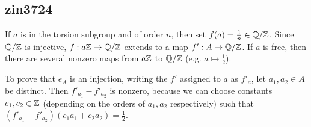 \subsection{zin3724} \label{ex2.3.2}
If $a$ is in the torsion subgroup and of order $n$, then set $f(a)=\frac{1}{n}\in\mathbb{Q}/\mathbb{Z}$. Since $\mathbb{Q}/\mathbb{Z}$ is injective, $f:a\mathbb{Z}\rightarrow\mathbb{Q}/\mathbb{Z}$ extends to a map $f':A\rightarrow\mathbb{Q}/\mathbb{Z}$. If $a$ is free, then there are several nonzero maps from $a\mathbb{Z}$ to $\mathbb{Q}/\mathbb{Z}$ (e.g. $a\mapsto\frac{1}{2}$).

To prove that $e_A$ is an injection, writing the $f'$ assigned to $a$ as $f'_a$, let $a_1,a_2\in A$ be distinct. Then $f'_{a_1}-f'_{a_2}$ is nonzero, because we can choose constants $c_1,c_2\in\mathbb{Z}$ (depending on the orders of $a_1,a_2$ respectively) such that $(f'_{a_1}-f'_{a_2})(c_1a_1+c_2a_2)=\frac{1}{2}$.